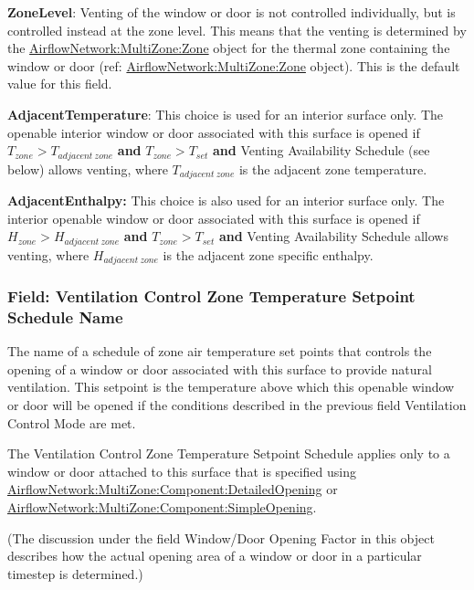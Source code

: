 \textbf{ZoneLevel}: Venting of the window or door is not controlled individually, but is controlled instead at the zone level. This means that the venting is determined by the \hyperref[airflownetworkmultizonezone]{AirflowNetwork:MultiZone:Zone} object for the thermal zone containing the window or door (ref: \hyperref[airflownetworkmultizonezone]{AirflowNetwork:MultiZone:Zone} object). This is the default value for this field.

\textbf{AdjacentTemperature}: This choice is used for an interior surface only.
The openable interior window or door associated with this surface is opened if
$T_{zone} > T_{adjacent\ zone}$ \textbf{and} $T_{zone} > T_{set}$ \textbf{and}
Venting Availability Schedule (see below) allows venting, where $T_{adjacent\ zone}$
is the adjacent zone temperature.

\textbf{AdjacentEnthalpy:} This choice is also used for an interior surface only.
The interior openable window or door associated with this surface is opened if
$H_{zone} > H_{adjacent\ zone}$ \textbf{and} $T_{zone} > T_{set}$ \textbf{and}
Venting Availability Schedule allows venting, where $H_{adjacent\ zone}$ is the
adjacent zone specific enthalpy.

\subsubsection{Field: Ventilation Control Zone Temperature Setpoint Schedule Name}\label{field-ventilation-control-zone-temperature-setpoint-schedule-name-1}

The name of a schedule of zone air temperature set points that controls the opening of a window or door associated with this surface to provide natural ventilation. This setpoint is the temperature above which this openable window or door will be opened if the conditions described in the previous field Ventilation Control Mode are met.

The Ventilation Control Zone Temperature Setpoint Schedule applies only to a window or door attached to this surface that is specified using \hyperref[airflownetworkmultizonecomponentdetailedopening]{AirflowNetwork:MultiZone:Component:DetailedOpening} or \hyperref[airflownetworkmultizonecomponentsimpleopening]{AirflowNetwork:MultiZone:Component:SimpleOpening}.

(The discussion under the field Window/Door Opening Factor in this object describes how the actual opening area of a window or door in a particular timestep is determined.)

